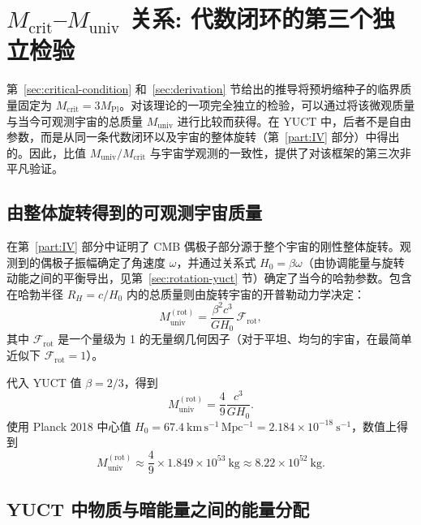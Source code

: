 \documentclass[11pt,a4paper]{article}
\begin{document}
	\section{\(M_{\mathrm{crit}}\)–\(M_{\mathrm{univ}}\) 关系: 代数闭环的第三个独立检验}
	\label{sec:third-test}
	
	第~\ref{sec:critical-condition} 和~\ref{sec:derivation} 节给出的推导将预坍缩种子的临界质量固定为 \(M_{\mathrm{crit}} = 3 M_{\mathrm{Pl}}\)。对该理论的一项完全独立的检验，可以通过将该微观质量与当今可观测宇宙的总质量 \(M_{\mathrm{univ}}\) 进行比较而获得。在 YUCT 中，后者不是自由参数，而是从同一条代数闭环以及宇宙的整体旋转（第~\ref{part:IV} 部分）中得出的。因此，比值 \(M_{\mathrm{univ}} / M_{\mathrm{crit}}\) 与宇宙学观测的一致性，提供了对该框架的第三次非平凡验证。
	
	\subsection{由整体旋转得到的可观测宇宙质量}
	
	在第~\ref{part:IV} 部分中证明了 CMB 偶极子部分源于整个宇宙的刚性整体旋转。观测到的偶极子振幅确定了角速度 \(\omega\)，并通过关系式 \(H_0 = \beta \omega\)（由协调能量与旋转动能之间的平衡导出，见第~\ref{sec:rotation-yuct} 节）确定了当今的哈勃参数。包含在哈勃半径 \(R_H = c / H_0\) 内的总质量则由旋转宇宙的开普勒动力学决定：
	\begin{equation}
		M_{\mathrm{univ}}^{\mathrm{(rot)}} = \frac{\beta^2 c^3}{G H_0} \, \mathcal{F}_{\mathrm{rot}},
		\label{eq:muniv-rot}
	\end{equation}
	其中 \(\mathcal{F}_{\mathrm{rot}}\) 是一个量级为 1 的无量纲几何因子（对于平坦、均匀的宇宙，在最简单近似下 \(\mathcal{F}_{\mathrm{rot}} = 1\)）。
	
	代入 YUCT 值 \(\beta = 2/3\)，得到
	\begin{equation}
		M_{\mathrm{univ}}^{\mathrm{(rot)}} = \frac{4}{9} \frac{c^3}{G H_0}.
		\label{eq:muniv-rot-beta}
	\end{equation}
	使用 Planck 2018 中心值 \(H_0 = 67.4\ \mathrm{km\,s^{-1}\,Mpc^{-1}} = 2.184\times 10^{-18}\ \mathrm{s^{-1}}\)，数值上得到
	\[
	M_{\mathrm{univ}}^{\mathrm{(rot)}} \approx \frac{4}{9} \times 1.849\times 10^{53}\ \mathrm{kg} \approx 8.22\times 10^{52}\ \mathrm{kg}.
	\]
	
	\subsection{YUCT 中物质与暗能量之间的能量分配}
	
\end{document}
